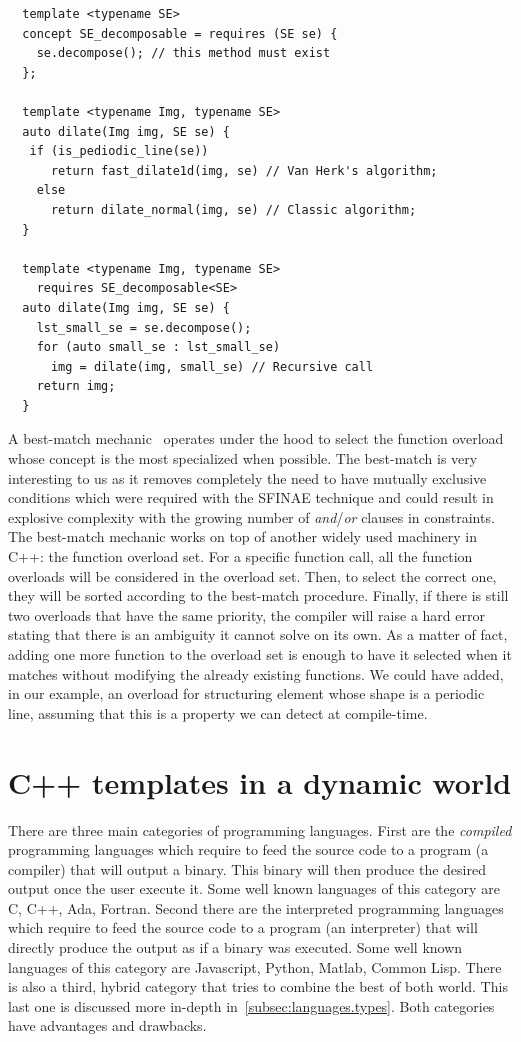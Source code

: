 \begin{verbatim}
  template <typename SE>
  concept SE_decomposable = requires (SE se) {
    se.decompose(); // this method must exist
  };

  template <typename Img, typename SE>
  auto dilate(Img img, SE se) {
   if (is_pediodic_line(se))
      return fast_dilate1d(img, se) // Van Herk's algorithm;
    else
      return dilate_normal(img, se) // Classic algorithm;
  }

  template <typename Img, typename SE>
    requires SE_decomposable<SE>
  auto dilate(Img img, SE se) {
    lst_small_se = se.decompose();
    for (auto small_se : lst_small_se)
      img = dilate(img, small_se) // Recursive call
    return img;
  }
\end{verbatim}
A best-match mechanic~\parencite{dosries.2066.specifying.proc} operates under the hood to select the function overload
whose concept is the most specialized when possible. The best-match is very interesting to us as it removes completely
the need to have mutually exclusive conditions which were required with the SFINAE technique and could result in
explosive complexity with the growing number of \emph{and}/\emph{or} clauses in constraints. The best-match mechanic
works on top of another widely used machinery in C++: the function overload set. For a specific function call, all the
function overloads will be considered in the overload set. Then, to select the correct one, they will be sorted
according to the best-match procedure. Finally, if there is still two overloads that have the same priority, the
compiler will raise a hard error stating that there is an ambiguity it cannot solve on its own. As a matter of fact,
adding one more function to the overload set is enough to have it selected when it matches without modifying the already
existing functions. We could have added, in our example, an overload for structuring element whose shape is a periodic
line, assuming that this is a property we can detect at compile-time.

\section{C++ templates in a dynamic world}
\label{sec:template.dynworld}

There are three main categories of programming languages. First are the \emph{compiled} programming languages which
require to feed the source code to a program (a compiler) that will output a binary. This binary will then produce the
desired output once the user execute it. Some well known languages of this category are C, C++, Ada, Fortran. Second
there are the interpreted programming languages which require to feed the source code to a program (an interpreter) that
will directly produce the output as if a binary was executed. Some well known languages of this category are Javascript,
Python, Matlab, Common Lisp. There is also a third, hybrid category that tries to combine the best of both world. This
last one is discussed more in-depth in~\cref{subsec:languages.types}. Both categories have advantages and drawbacks.

